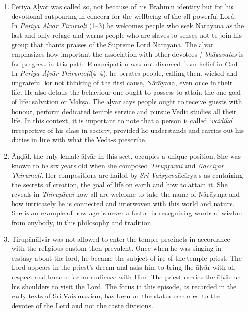 \begin{enumerate}[{\rm 1.}]
\itemsep=0pt
\item Periya Āḷvār was called so, not because of his Brahmin identity but for his devotional outpouring in concern for the wellbeing of the all-powerful Lord. In \textit{Periya Āḷvār Tirumoḷi} (1–3) he welcomes people who seek Nārāyana as the last and only refuge and warns people who are slaves to senses not to join his group that chants praises of the Supreme Lord Nārāyana. The āḷvār emphasizes how important the association with other devotees / \textit{bhāgavatas} is for progress in this path. Emancipation was not divorced from belief in God. In \textit{Periya Āḷvār Thirumoḷi}(4–4), he berates people, calling them wicked and ungrateful for not thinking of the first cause, Nārāyaṇa, even once in their life. He also details the behaviour one ought to possess to attain the one goal of life: salvation or Mokṣa. The āḷvār says people ought to receive guests with honour, perform dedicated temple service and pursue Vedic studies all their life. In this context, it is important to note that a person is called ‘\textit{vaidika}’ irrespective of his class in society, provided he understands and carries out his duties in line with what the Veda-s prescribe.

 \item Āṇḍāl, the only female āḷvār in this sect, occupies a unique position. She was known to be six years old when she composed \textit{Tiruppāvai} and \textit{Nācciyār Thirumoḷi}. Her compositions are hailed by \textit{Sri Vaiṣņava}ācārya-s as containing the secrets of creation, the goal of life on earth and how to attain it. She reveals in \textit{Thirupāvai} how all are welcome to take the name of Nārāyaṇa and how intricately he is connected and interwoven with this world and nature. She is an example of how age is never a factor in recognizing words of wisdom from anybody, in this philosophy and tradition.

 \item Tirupānāḷvār was not allowed to enter the temple precincts in accordance with the religious custom then prevalent. Once when he was singing in ecstasy about the lord, he became the subject of ire of the temple priest. The Lord appears in the priest’s dream and asks him to bring the āḷvār with all respect and honour for an audience with Him. The priest carries the āḷvār on his shoulders to visit the Lord. The focus in this episode, as recorded in the early texts of Sri Vaishnavism, has been on the status accorded to the devotee of the Lord and not the caste divisions.


\end{enumerate}
